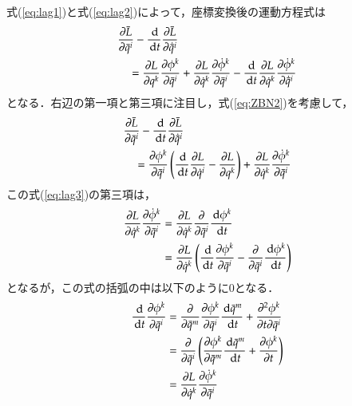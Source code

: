             式(\ref{eq:lag1})と式(\ref{eq:lag2})によって，座標変換後の運動方程式は
                \begin{align*}
                                        \mbox{} &\frac{\partial \bar{L}}{\partial \bar{q}^{i}} -\frac{\,\mathrm{d} }{\,\mathrm{d} t} \frac{\partial \bar{L}}{\partial \dot{\bar{q}}^{i}} \\
                            &\quad =\frac{\partial L}{\partial q^{k}}\frac{\partial \phi^{k}}{\partial \bar{q}^{i}}
                    +\frac{\partial L}{\partial \dot{q}^{k}}\frac{\partial \dot{\phi}^{k}}{\partial \bar{q}^{i}}
                    -\frac{\,\mathrm{d} }{\,\mathrm{d} t}\frac{\partial L}{\partial \dot{q}^{k}}\frac{\partial \dot{\phi}^{k}}{\partial \dot{\bar{q}}^{i}}
                \end{align*}
            となる．右辺の第一項と第三項に注目し，式(\ref{eq:ZBN2})を考慮して，
                \begin{align}\label{eq:lag3}
                    \mbox{} &\frac{\rd \bar{L}}{\rd \bar{q}^{i}} -\frac{\df }{\df t} \frac{\rd \bar{L}}{\rd \dot{\bar{q}}^{i}} \notag \\
                            &\quad=\frac{\rd \phi^{k}}{\rd \bar{q}^{i}}\left(\frac{\df }{\df t}\frac{\rd L}{\rd \dot{q}^{i}} -\frac{\rd L}{\rd q^{k}}\right)
                              +\frac{\rd L}{\rd \dot{q}^{k}}\frac{\rd \dot{\phi}^{k}}{\rd \bar{q}^{i}}
                \end{align}
            この式(\ref{eq:lag3})の第三項は，
                \begin{align*}
                    \frac{\partial L}{\partial \dot{q}^{k}}\frac{\partial \dot{\phi}^{k}}{\partial \bar{q}^{i}}
                        &=\frac{\partial L}{\partial \dot{q}^{k}}\frac{\partial }{\partial \bar{q}^{i}}\frac{\,\mathrm{d} \phi^{k}}{\,\mathrm{d} t} \\
                        &=\frac{\partial L}{\partial \dot{q}^{k}}\left( \frac{\,\mathrm{d} }{\,\mathrm{d} t}\frac{\partial \phi^{k}}{\partial \bar{q}^{i}}
                            - \frac{\partial}{\partial \bar{q}^{i}}\frac{\,\mathrm{d} \phi^{k}}{\,\mathrm{d} t}\right)
                \end{align*}
            となるが，この式の括弧の中は以下のように0となる．
                \begin{align*}
                    \frac{\,\mathrm{d} }{\,\mathrm{d} t}\frac{\partial \phi^{k}}{\partial \bar{q}^{i}}
                        &=\frac{\partial }{\partial \bar{q}^{m}}\frac{\partial \phi^{k}}{\partial \bar{q}^{i}}\frac{\,\mathrm{d} \bar{q}^{m}}{\,\mathrm{d} t}
                            +\frac{\partial ^{2}\phi^{k}}{\partial t \partial \bar{q}^{i}} \\
                        &=\frac{\partial }{\partial \bar{q}^{i}}\left( \frac{\partial \phi^{k}}{\partial \bar{q}^{m}}\frac{\,\mathrm{d} \bar{q}^{m}}{\,\mathrm{d} t}
                            +\frac{\partial \phi^{k}}{\partial t}\right) \\
                        &=\frac{\partial L}{\partial \dot{q}^{k}}\frac{\partial \dot{\phi}^{k}}{\partial \bar{q}^{i}}
                \end{align*}
